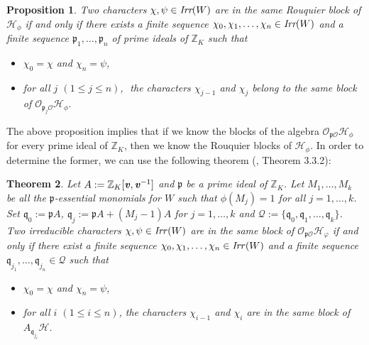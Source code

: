 \documentclass[10pt,a4paper,titlepage]{article}
\newtheorem{theorem}{Theorem}[section]
\newtheorem{proposition}[theorem]{Proposition}
\begin{document}
\begin{proposition}\label{Rouquier blocks and central characters}
Two characters $\chi,\psi \in \emph{Irr}(W)$ are in the same Rouquier block of $\mathcal{H}_\phi$
if and only if there exists a finite sequence
$\chi_0,\chi_1,\ldots,\chi_n \in \emph{Irr}(W)$ and a finite
sequence $\mathfrak{p}_1,\ldots,\mathfrak{p}_n$ of  prime
ideals of $\mathbb{Z}_K$ such that
\begin{itemize}
  \item $\chi_0=\chi$ and $\chi_n=\psi$,
  \item for all $j$ $(1\leq j \leq n)$,\,\,
         the characters $\chi_{j-1}$ and $\chi_{j}$
         belong to the same block of
         $\mathcal{O}_{\mathfrak{p}_j\mathcal{O}}\mathcal{H}_\phi.$
 \end{itemize}                   
\end{proposition}

The above proposition implies that if we know the blocks of the algebra $\mathcal{O}_{\mathfrak{p}\mathcal{O}}\mathcal{H}_\phi$ for every  prime
ideal of $\mathbb{Z}_K$,
then we know the Rouquier blocks of  $\mathcal{H}_\phi$. In order to determine the former, we
can use the following theorem (\cite{Chlou}, Theorem 3.3.2):

\begin{theorem}\label{main theorem}
Let $A:=\mathbb{Z}_K[\textbf{\emph{v}},\textbf{\emph{v}}^{-1}]$ and $\mathfrak{p}$ be a prime
ideal of $\mathbb{Z}_K$. 
Let $M_1,\ldots, M_k$ be all the
$\mathfrak{p}$-essential monomials for $W$ such that $\phi(M_j)=1$
for all $j=1,\ldots,k$. Set $\mathfrak{q}_0:=\mathfrak{p}A$,
$\mathfrak{q}_j:=\mathfrak{p}A+(M_j-1)A$ for $j=1,\ldots,k$ and
$\mathcal{Q}:=\{\mathfrak{q}_0,\mathfrak{q}_1,\ldots,\mathfrak{q}_k\}$.
Two irreducible characters $\chi,\psi \in \textrm{\emph{Irr}}(W)$
are in the same block of $\mathcal{O}_{\mathfrak{p}\mathcal{O}}\mathcal{H}_\varphi$ if
and only if there exist a finite sequence
$\chi_0,\chi_1,\ldots,\chi_n \in \textrm{\emph{Irr}}(W)$ and a
finite sequence $\mathfrak{q}_{j_1},\ldots,\mathfrak{q}_{j_n} \in
\mathcal{Q}$ such that
\begin{itemize}
  \item $\chi_0=\chi$ and $\chi_n=\psi$,
  \item for all $i$ $(1\leq i \leq n)$,  the characters $\chi_{i-1}$ and $\chi_i$ are
  in the same block of $A_{\mathfrak{q}_{j_i}}\mathcal{H}$.
\end{itemize}
\end{theorem}
\end{document}
